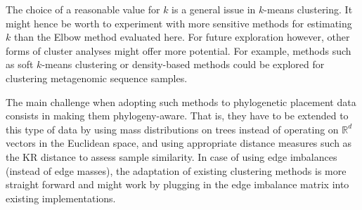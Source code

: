 The choice of a reasonable value for $k$ is a general issue in $k$-means clustering.
It might hence be worth to experiment with more sensitive methods for estimating $k$ than the Elbow method evaluated here.
For future exploration however, other forms of cluster analyses might offer more potential.
For example, methods such as soft $k$-means clustering \cite{Dunn1973,Bezdek1981} or density-based methods \cite{Kriegel2011}
could be explored for clustering metagenomic sequence samples.

The main challenge when adopting such methods to phylogenetic placement data consists in making them phylogeny-aware.
That is, they have to be extended to this type of data by
using mass distributions on trees instead of operating on $\mathbb{R}^d$ vectors in the Euclidean space,
and using appropriate distance measures such as the KR distance to assess sample similarity.
In case of using edge imbalances (instead of edge masses),
the adaptation of existing clustering methods is more straight forward
and might work by plugging in the edge imbalance matrix into existing implementations.

